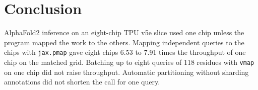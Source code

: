\section{Conclusion}\label{sec:conclusion}
AlphaFold2 inference on an eight-chip TPU v5e slice used one chip unless the program mapped the work to the others.
Mapping independent queries to the chips with \texttt{jax.pmap} gave eight chips 6.53 to 7.91 times the throughput of one chip on the matched grid. %
Batching up to eight queries of 118 residues with \texttt{vmap} on one chip did not raise throughput. %
Automatic partitioning without sharding annotations did not shorten the call for one query.
